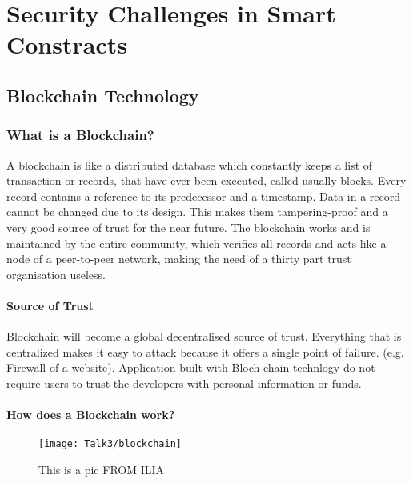 \chapter{Security Challenges in Smart Constracts}


\newpage

\minitoc %

\newpage


\section{Blockchain Technology}
\subsection{What is a Blockchain?}
A blockchain is like a distributed database which constantly keeps a list of transaction or records, that have ever been executed, called usually blocks. Every record contains a reference to its predecessor and a timestamp. \cite{wikipedia1}
Data in a record cannot be changed due to its design. This makes them tampering-proof and a very good source of trust for the near future. \cite{blockchain3}
The blockchain works and is maintained by the entire community, which verifies all records and acts like a node of a peer-to-peer network, making the need of a thirty part trust organisation useless. \cite{blockchain0}
\subsubsection{Source of Trust}
Blockchain will become a global decentralised source of trust.
Everything that is centralized makes it easy to attack because it offers a single point of failure. 
(e.g. Firewall of a website). 
Application built with Bloch chain technlogy do not require  users to trust the developers with personal information or funds. 
\subsubsection{How does a Blockchain work?}
           \begin{figure}[ht]
         \begin{center}
         \texttt{[image: Talk3/blockchain]}
         \end{center}
         \caption{This is a pic FROM ILIA}
         \label{label}
       \end{figure}
   
